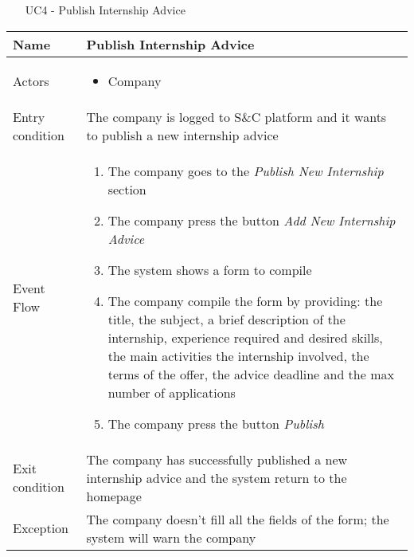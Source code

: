 			\begin{table} [H]
				\centering
					\begin{itemize}
					\item [UC4] - Publish Internship Advice
				\end{itemize}
				\begin{tabular}{|| P{7.5cm} | P{7.5cm} ||}
					\hline
					Name & Publish Internship Advice \\
					\hline
					Actors & \parbox{5cm}{\begin{itemize}
							\item Company
						\end{itemize}
					} \\
					\hline
					Entry condition & The company is logged to S\&C platform and it wants to publish a new internship advice \\
					\hline
					Event Flow & \parbox{5cm}{\begin{enumerate}[label=\alpha]
							\item The company goes to the \textit{Publish 
							New Internship} section
							\item The company press the button \textit{Add 
							New Internship Advice} 
							\item The system shows a form to compile
							\item The company compile the form by 
							providing: the title, the subject, a 
							brief description of the internship, 
							experience required and desired 
							skills, the main activities the 
							internship involved, the terms of the 
							offer, the advice deadline and the 
							max number of applications
							\item The company press the button 
							\textit{Publish}
					\end{enumerate}} \\
					\hline 
					Exit condition & The company has successfully published a 
					new internship advice and the system 
					return to the homepage  \\
					\hline
					Exception & The company doesn’t fill all the 
					fields of the form; the system will 
					warn the company \\
					\hline
				\end{tabular}
				\end{table}
				
				
				
